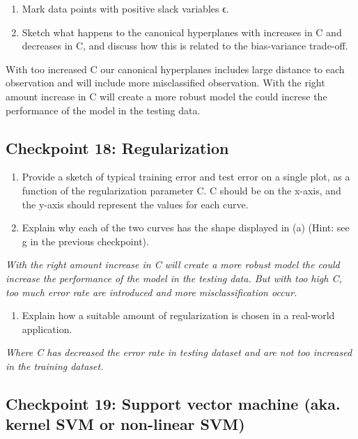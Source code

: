 \documentclass[
  letterpaper,
  DIV=11,
  numbers=noendperiod]{scrartcl}
\providecommand{\tightlist}{%
  \setlength{\itemsep}{0pt}\setlength{\parskip}{0pt}}\usepackage{longtable,booktabs,array}
\begin{document}
\begin{enumerate}
\def\labelenumi{(\alph{enumi})}
\setcounter{enumi}{5}
\item
  Mark data points with positive slack variables ϵ.
\item
  Sketch what happens to the canonical hyperplanes with increases in C
  and decreases in C, and discuss how this is related to the
  bias-variance trade-off.
\end{enumerate}

With too increased C our canonical hyperplanes includes large distance
to each observation and will include more misclassified observation.
With the right amount increase in C will create a more robust model the
could increse the performance of the model in the testing data.

\hypertarget{checkpoint-18-regularization}{%
\subsection{Checkpoint 18:
Regularization}\label{checkpoint-18-regularization}}

\begin{enumerate}
\def\labelenumi{(\alph{enumi})}
\item
  Provide a sketch of typical training error and test error on a single
  plot, as a function of the regularization parameter C. C should be on
  the x-axis, and the y-axis should represent the values for each curve.
\item
  Explain why each of the two curves has the shape displayed in (a)
  (Hint: see g in the previous checkpoint).
\end{enumerate}

\emph{With the right amount increase in C will create a more robust
model the could increase the performance of the model in the testing
data. But with too high C, too much error rate are introduced and more
misclassification occur.}

\begin{enumerate}
\def\labelenumi{(\alph{enumi})}
\setcounter{enumi}{2}
\tightlist
\item
  Explain how a suitable amount of regularization is chosen in a
  real-world application.
\end{enumerate}

\emph{Where C has decreased the error rate in testing dataset and are
not too increased in the training dataset.}

\hypertarget{checkpoint-19-support-vector-machine-aka.-kernel-svm-or-non-linear-svm}{%
\subsection{Checkpoint 19: Support vector machine (aka. kernel SVM or
non-linear
SVM)}\label{checkpoint-19-support-vector-machine-aka.-kernel-svm-or-non-linear-svm}}
\end{document}
